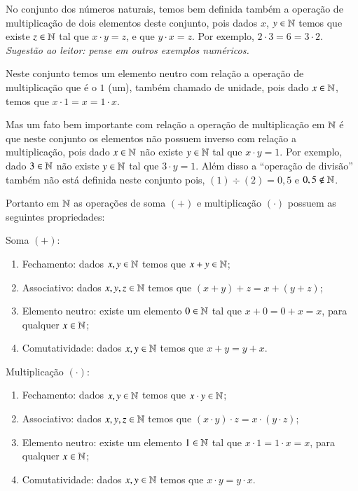  No conjunto dos números naturais, temos bem definida também a operação de multiplicação de dois elementos deste conjunto, pois dados $x$, $y \in \mathbb{N}$ temos que existe $z \in \mathbb{N}$ tal que $x \cdot y=z$, e que $y \cdot x=z$. Por exemplo, $2 \cdot 3=6=3 \cdot2$. \emph{Sugestão ao leitor: pense em outros exemplos numéricos.}
 
 Neste conjunto temos um elemento neutro com relação a operação de multiplicação que é o $1$ (um), também chamado de unidade, pois dado $x \in \mathbb{N}$, temos que $x \cdot 1= x= 1 \cdot x$.

 Mas um fato bem importante com relação a operação de multiplicação em $\mathbb{N}$ é que neste conjunto os elementos não possuem inverso com relação a multiplicação, pois dado $x \in \mathbb{N}$ não existe $y \in \mathbb{N}$ tal que $x \cdot y= 1$. Por exemplo, dado $3 \in \mathbb{N}$ não existe $y \in \mathbb{N}$ tal que $3 \cdot y= 1$. Além disso a ``operação de divisão'' também não está definida neste conjunto pois, $(1)\div (2)= 0,5$ e $0,5 \notin \mathbb{N}$. 
 
  \vskip0.3cm
 
 Portanto em $\mathbb{N}$ as operações de soma $(+)$ e multiplicação $(\cdot)$ possuem as seguintes propriedades:
 
 Soma $(+)$:
 \begin{enumerate}[1)]
 \item Fechamento: dados $x, y \in \mathbb{N}$ temos que $x+y \in \mathbb{N}$;
 \item Associativo: dados $x, y, z \in \mathbb{N}$ temos que $(x+y)+z= x+(y+z)$;
 \item Elemento neutro: existe um elemento $0 \in \mathbb{N}$ tal que $x+0=0+x=x$, para qualquer $x \in \mathbb{N}$;
 \item Comutatividade: dados $x, y \in \mathbb{N}$ temos que $x+y= y+x$.
 \end{enumerate}
 
  Multiplicação $(\cdot)$:
 \begin{enumerate}[1)]
 \item Fechamento: dados $x, y \in \mathbb{N}$ temos que $x \cdot y \in \mathbb{N}$;
 \item Associativo: dados $x, y, z \in \mathbb{N}$ temos que $(x \cdot y) \cdot z= x \cdot (y \cdot z)$;
 \item Elemento neutro: existe um elemento $1 \in \mathbb{N}$ tal que $x \cdot 1= 1 \cdot x= x$, para qualquer $x \in \mathbb{N}$;
 \item Comutatividade: dados $x, y \in \mathbb{N}$ temos que $x \cdot y= y \cdot x$.
 \end{enumerate}
 
